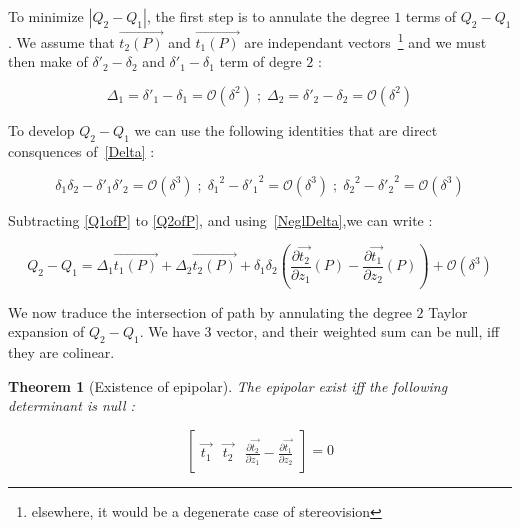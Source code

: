\documentclass[a4paper]{article}
\newcommand{\BigV}[1]{\ensuremath{\overrightarrow{#1}}}
\newcommand{\TanO}[1]{\BigV{t_1#1}}
\newcommand{\TanT}[1]{\BigV{t_2#1}}
\newcommand{\Negl}[1]{\ensuremath{\mathcal{O}(#1)}}
\newcommand{\DerPart}[2]{\frac{\partial #1}{\partial #2}}
\newtheorem{theorem}{Theorem}
\begin{document}
To minimize $|Q_2 -Q_1|$, the first step is to annulate the degree $1$ terms of $ Q_2 -Q_1$ . We assume
that $\TanT{(P)}$ and $\TanO{(P)}$  are independant vectors~\footnote{elsewhere, it would be a 
degenerate case of stereovision} and we must then make of $\delta'_2 -\delta_2$ and $\delta'_1 -\delta_1$
term of degre $2$ :

\begin{equation}
   \Delta_1 =   \delta'_1 -\delta_1 = \Negl{\delta^2}  \; ; \; \Delta_2 =   \delta'_2 -\delta_2 = \Negl{\delta^2}
   \label{Delta}
\end{equation}

To develop $ Q_2 -Q_1$ we can use the following identities  that are direct consquences of~\ref{Delta} :

\begin{equation}
   \delta_1  \delta_2 -  \delta'_1  \delta'_2  = \Negl{\delta^3} \;;\;
   {\delta_1}^2 - {\delta'_1}^2 =  \Negl{\delta^3} \;;\;
   {\delta_2}^2 - {\delta'_2}^2 =  \Negl{\delta^3} 
   \label{NeglDelta}
\end{equation}

Subtracting \ref{Q1ofP} to \ref{Q2ofP}, and using~\ref{NeglDelta},we can write :

\begin{equation}
    Q_2 -Q_1 =   \Delta_1 \TanO{(P)} +   \Delta_2 \TanT{(P)}  
               + \delta_1  \delta_2(\DerPart { \TanT{}}{z_1}(P)  -\DerPart { \TanO{}}{z_2}(P) )
               + \Negl{\delta^3}
\end{equation}


We now traduce the intersection of path by annulating the degree $2$ Taylor expansion of $Q_2 -Q_1$.
We have  $3$ vector, and their weighted sum can be null, iff they are colinear.

\begin{theorem}[Existence of epipolar]
The epipolar exist iff the following determinant is null :

\begin{equation}
\left[ \begin{array}{c|c|c}
\TanO{} & \TanT{}  & \DerPart { \TanT{}}{z_1}  -\DerPart { \TanO{}}{z_2}  
\end{array} \right]  
=0
\end{equation}

\end{theorem}
\end{document}
